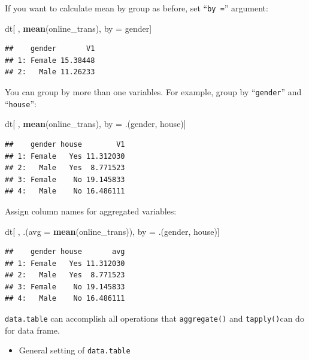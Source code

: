 \documentclass[]{book}
\newenvironment{Shaded}{\begin{snugshade}}{\end{snugshade}}
\newcommand{\KeywordTok}[1]{\textcolor[rgb]{0.13,0.29,0.53}{\textbf{{#1}}}}
\newcommand{\DataTypeTok}[1]{\textcolor[rgb]{0.13,0.29,0.53}{{#1}}}
\newcommand{\StringTok}[1]{\textcolor[rgb]{0.31,0.60,0.02}{{#1}}}
\newcommand{\NormalTok}[1]{{#1}}
\providecommand{\tightlist}{%
  \setlength{\itemsep}{0pt}\setlength{\parskip}{0pt}}
\theoremstyle{definition}
\theoremstyle{definition}
\theoremstyle{remark}
\begin{document}
If you want to calculate mean by group as before, set ``\texttt{by\ =}''
argument:

\begin{Shaded}
\begin{Highlighting}[]
\NormalTok{dt[ , }\KeywordTok{mean}\NormalTok{(online_trans), by =}\StringTok{ }\NormalTok{gender]}
\end{Highlighting}
\end{Shaded}

\begin{verbatim}
##    gender       V1
## 1: Female 15.38448
## 2:   Male 11.26233
\end{verbatim}

You can group by more than one variables. For example, group by
``\texttt{gender}'' and ``\texttt{house}'':

\begin{Shaded}
\begin{Highlighting}[]
\NormalTok{dt[ , }\KeywordTok{mean}\NormalTok{(online_trans), by =}\StringTok{ }\NormalTok{.(gender, house)]}
\end{Highlighting}
\end{Shaded}

\begin{verbatim}
##    gender house        V1
## 1: Female   Yes 11.312030
## 2:   Male   Yes  8.771523
## 3: Female    No 19.145833
## 4:   Male    No 16.486111
\end{verbatim}

Assign column names for aggregated variables:

\begin{Shaded}
\begin{Highlighting}[]
\NormalTok{dt[ , .(}\DataTypeTok{avg =} \KeywordTok{mean}\NormalTok{(online_trans)), by =}\StringTok{ }\NormalTok{.(gender, house)]}
\end{Highlighting}
\end{Shaded}

\begin{verbatim}
##    gender house       avg
## 1: Female   Yes 11.312030
## 2:   Male   Yes  8.771523
## 3: Female    No 19.145833
## 4:   Male    No 16.486111
\end{verbatim}

\texttt{data.table} can accomplish all operations that
\texttt{aggregate()} and \texttt{tapply()}can do for data frame.

\begin{itemize}
\tightlist
\item
  General setting of \texttt{data.table}
\end{itemize}
\end{document}
